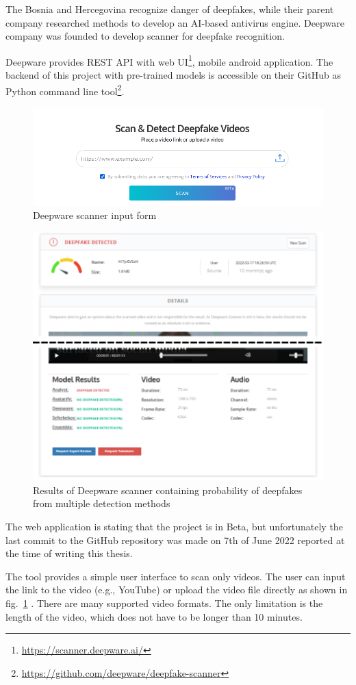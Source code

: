 The Bosnia and Hercegovina recognize danger of deepfakes, while their parent company researched methods to develop an AI-based antivirus engine. Deepware company was founded to develop scanner for deepfake recognition.

Deepware provides REST API with web UI\footnote{\url{https://scanner.deepware.ai/}}, mobile android application. The backend of this project with pre-trained models is accessible on their GitHub as Python command line tool\footnote{\url{ https://github.com/deepware/deepfake-scanner}}.

\begin{figure}[H]
    \centering
    \includegraphics[width=.65\linewidth]{other-fig/deepware_input.png}
    \caption{Deepware scanner input form}
    \label{fig:deepware_input}
\end{figure}

\begin{figure}[H]
    \centering
    \includegraphics[width=.58\linewidth]{other-fig/deepware_results.png}
    \caption{Results of Deepware scanner containing probability of deepfakes from multiple detection methods}
    \label{fig:deepware_results}
\end{figure}

The web application is stating that the project is in Beta, but unfortunately the last commit to the GitHub repository was made on 7th of June 2022 reported at the time of writing this thesis.

The tool provides a simple user interface to scan only videos. The user can input the link to the video (e.g., YouTube) or upload the video file directly as shown in fig.~\ref{fig:deepware_input} . There are many supported video formats. The only limitation is the length of the video, which does not have to be longer than 10 minutes.

